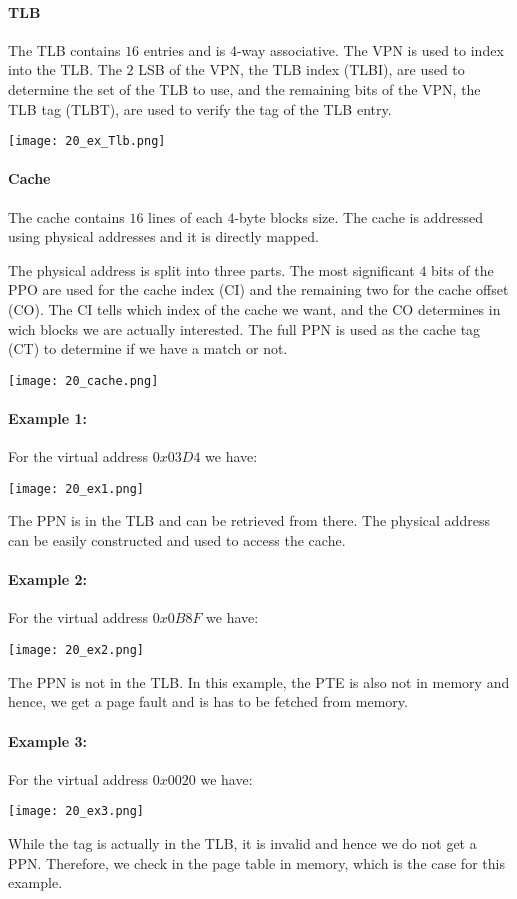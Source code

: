 \paragraph{TLB}
The TLB contains $16$ entries and is $4$-way associative. The VPN is used to index into the TLB. The $2$ LSB of the VPN, the TLB index (TLBI), are used to determine the set of the TLB to use, and the remaining bits of the VPN, the TLB tag (TLBT), are used to verify the tag of the TLB entry.

\texttt{[image: 20\_ex\_Tlb.png]}

\paragraph{Cache}
The cache contains $16$ lines of each $4$-byte blocks size. The cache is addressed using physical addresses and it is directly mapped.

The physical address is split into three parts. The most significant $4$ bits of the PPO are used for the cache index (CI) and the remaining two for the cache offset (CO). The CI tells which index of the cache we want, and the CO determines in wich blocks we are actually interested. The full PPN is used as the cache tag (CT) to determine if we have a match or not.

\texttt{[image: 20\_cache.png]}

\paragraph{Example 1:}
For the virtual address $0x03D4$ we have:

\texttt{[image: 20\_ex1.png]}

The PPN is in the TLB and can be retrieved from there. The physical address can be easily constructed and used to access the cache.


\paragraph{Example 2:}
For the virtual address $0x0B8F$ we have:

\texttt{[image: 20\_ex2.png]}

The PPN is not in the TLB. In this example, the PTE is also not in memory and hence, we get a page fault and is has to be fetched from memory.

\paragraph{Example 3:}
For the virtual address $0x0020$ we have:

\texttt{[image: 20\_ex3.png]}

While the tag is actually in the TLB, it is invalid and hence we do not get a PPN. Therefore, we check in the page table in memory, which is the case for this example.
